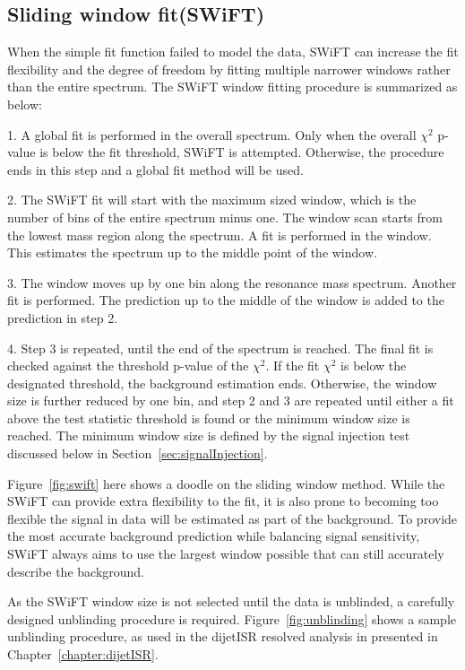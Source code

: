     \subsection{Sliding window fit(SWiFT)}
    When the simple fit function failed to model the data, SWiFT can increase the fit flexibility and the degree of freedom by fitting multiple narrower windows rather than the entire spectrum. The SWiFT window fitting procedure is summarized as below:
    
    1. A global fit is performed in the overall spectrum. Only when the overall $\chi^{2}$ p-value is below the fit threshold, SWiFT is attempted. Otherwise, the procedure ends in this step and a global fit method will be used. 

    2. The SWiFT fit will start with the maximum sized window, which is the number of bins of the entire spectrum minus one. The window scan starts from the lowest mass region along the spectrum. A fit is performed in the window. This estimates the spectrum up to the middle point of the window.

    3. The window moves up by one bin along the resonance mass spectrum. Another fit is performed. The prediction up to the middle of the window is added to the prediction in step 2. 

    4. Step 3 is repeated, until the end of the spectrum is reached. The final fit is checked against the threshold p-value of the $\chi^{2}$. If the fit $\chi^{2}$ is below the designated threshold, the background estimation ends. Otherwise, the window size is further reduced by one bin, and step 2 and 3 are repeated until either a fit above the test statistic threshold is found or the minimum window size is reached. The minimum window size is defined by the signal injection test discussed
    below in Section~\ref{sec:signalInjection}.

    Figure~\ref{fig:swift} here shows a doodle on the sliding window method.
    While the SWiFT can provide extra flexibility to the fit, it is also prone to becoming too flexible the signal in data will be estimated as part of the background. To provide the most accurate background prediction while balancing signal sensitivity, SWiFT always aims to use the largest window possible that can still accurately describe the background. 

As the SWiFT window size is not selected until the data is unblinded, a carefully designed unblinding procedure is required. Figure~\ref{fig:unblinding} shows a sample unblinding procedure, as used in the dijetISR resolved analysis in presented in Chapter~\ref{chapter:dijetISR}.

